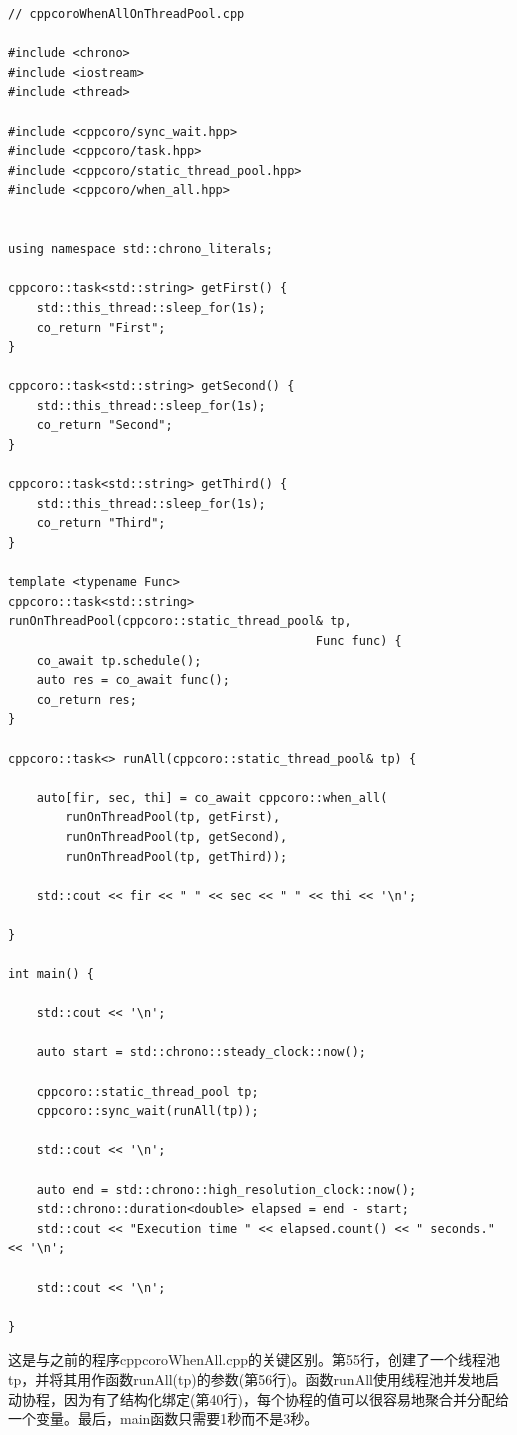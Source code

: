 \begin{lstlisting}[style=styleCXX]
// cppcoroWhenAllOnThreadPool.cpp

#include <chrono>
#include <iostream>
#include <thread>

#include <cppcoro/sync_wait.hpp>
#include <cppcoro/task.hpp>
#include <cppcoro/static_thread_pool.hpp>
#include <cppcoro/when_all.hpp>


using namespace std::chrono_literals;

cppcoro::task<std::string> getFirst() {
	std::this_thread::sleep_for(1s);
	co_return "First";
}

cppcoro::task<std::string> getSecond() {
	std::this_thread::sleep_for(1s);
	co_return "Second";
}

cppcoro::task<std::string> getThird() {
	std::this_thread::sleep_for(1s);
	co_return "Third";
}

template <typename Func>
cppcoro::task<std::string> runOnThreadPool(cppcoro::static_thread_pool& tp,
                                           Func func) {
	co_await tp.schedule();
	auto res = co_await func();
	co_return res;
}

cppcoro::task<> runAll(cppcoro::static_thread_pool& tp) {

	auto[fir, sec, thi] = co_await cppcoro::when_all(
		runOnThreadPool(tp, getFirst),
		runOnThreadPool(tp, getSecond),
		runOnThreadPool(tp, getThird));
	
	std::cout << fir << " " << sec << " " << thi << '\n';

}

int main() {

	std::cout << '\n';
	
	auto start = std::chrono::steady_clock::now();
	
	cppcoro::static_thread_pool tp;
	cppcoro::sync_wait(runAll(tp));
	
	std::cout << '\n';
	
	auto end = std::chrono::high_resolution_clock::now();
	std::chrono::duration<double> elapsed = end - start;
	std::cout << "Execution time " << elapsed.count() << " seconds." << '\n';
	
	std::cout << '\n';

}
\end{lstlisting}

这是与之前的程序cppcoroWhenAll.cpp的关键区别。第55行，创建了一个线程池tp，并将其用作函数runAll(tp)的参数(第56行)。函数runAll使用线程池并发地启动协程，因为有了结构化绑定(第40行)，每个协程的值可以很容易地聚合并分配给一个变量。最后，main函数只需要1秒而不是3秒。

